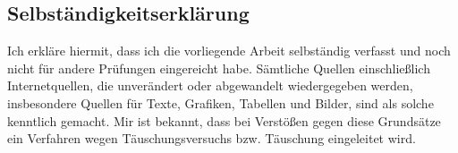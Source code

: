 \documentclass[
a4paper,
pagesize,
pdftex,
12pt,
twoside, %
BCOR=5mm, %
ngerman,
fleqn,
final,
]{scrartcl}
\begin{document}
	
	\cleardoublepage%
	{\parindent0cm
		\subsection*{Selbständigkeitserklärung}
		Ich erkläre hiermit, dass ich die vorliegende Arbeit selbständig verfasst
		und noch nicht für andere Prüfungen eingereicht habe.
		Sämtliche Quellen einschließlich Internetquellen, die unverändert oder
		abgewandelt wiedergegeben werden, insbesondere Quellen für Texte, Grafiken,
		Tabellen und Bilder, sind als solche kenntlich gemacht. Mir ist bekannt,
		dass bei Verstößen gegen diese Grundsätze ein Verfahren wegen
		Täuschungsversuchs bzw. Täuschung eingeleitet wird.
		\vspace{3\baselineskip}
		
	}

	
\end{document}
